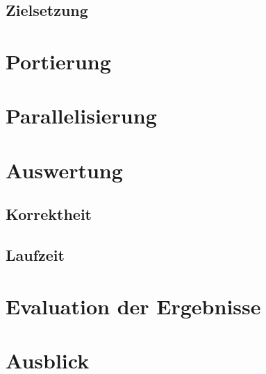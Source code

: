 \documentclass[10pt,a4paper]{article}
\begin{document}
\subsection{Zielsetzung}
\section{Portierung}

\section{Parallelisierung}
\section{Auswertung}

\subsection{Korrektheit}
 
\subsection{Laufzeit}
 
\section{Evaluation der Ergebnisse}

\section{Ausblick}
\end{document}

